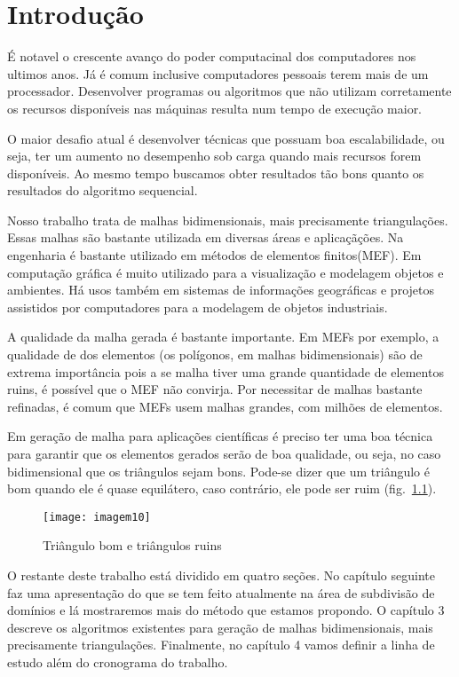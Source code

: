 \cleardoublepage
\pagestyle{fancy}

\chapter{Introdução}\label{intro}
É notavel o crescente avanço do poder computacinal dos computadores nos ultimos anos. Já é comum inclusive computadores pessoais terem mais de um processador. Desenvolver programas ou algoritmos que não utilizam corretamente os recursos disponíveis nas máquinas resulta num tempo de execução maior.

O maior desafio atual é desenvolver técnicas que possuam boa escalabilidade, ou seja, ter um aumento no desempenho sob carga quando mais recursos forem disponíveis. Ao mesmo tempo buscamos obter resultados tão bons quanto os resultados do algoritmo sequencial.

Nosso trabalho trata de malhas bidimensionais, mais precisamente triangulações. Essas malhas são bastante utilizada em diversas áreas e aplicaçãções. Na engenharia é bastante utilizado em métodos de elementos finitos(MEF). Em computação gráfica é muito utilizado para a visualização e modelagem objetos e ambientes. Há usos também em  sistemas de informações geográficas e projetos assistidos por computadores para a modelagem de objetos industriais.

A qualidade da malha gerada é bastante importante. Em MEFs por exemplo, a qualidade de dos elementos (os polígonos, em malhas bidimensionais) são de extrema importância pois a se malha tiver uma grande quantidade de elementos ruins, é possível que o MEF não convirja. Por necessitar de malhas bastante refinadas, é comum que MEFs usem malhas grandes, com milhões de elementos.

Em geração de malha para aplicações científicas é preciso ter uma boa técnica para garantir que os elementos gerados serão de boa qualidade, ou seja, no caso bidimensional que os triângulos sejam bons. Pode-se dizer que um triângulo é bom quando ele é quase equilátero, caso contrário, ele pode ser ruim (fig.~\ref{fig:imagem10}).

 \begin{figure}[htbp]
     \centering
     \texttt{[image: imagem10]}
     \caption{Triângulo bom e triângulos ruins} 
     \label{fig:imagem10}
 \end{figure}

O restante deste trabalho está dividido em quatro seções. No capítulo seguinte faz uma apresentação do que se tem feito atualmente na área de subdivisão de domínios e lá mostraremos mais do método que estamos propondo. O capítulo 3 descreve os algoritmos existentes para geração de malhas bidimensionais, mais precisamente triangulações. Finalmente, no capítulo 4 vamos definir a linha de estudo além do cronograma do trabalho.


